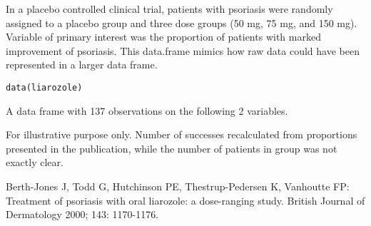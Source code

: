 \begin{Description}\relax
In a placebo controlled clinical trial, patients with psoriasis were randomly assigned
to a placebo group and three dose groups (50 mg, 75 mg, and 150 mg). Variable of primary
interest was the proportion of patients with marked improvement of psoriasis.
This data.frame mimics how raw data could have been represented in a larger data frame.
\end{Description}
\begin{Usage}
\begin{verbatim}data(liarozole)\end{verbatim}
\end{Usage}
\begin{Format}\relax
A data frame with 137 observations on the following 2 variables.
\end{Format}
\begin{Details}\relax
For illustrative purpose only. Number of successes recalculated from proportions
presented in the publication, while the number of patients in group  was not exactly clear.
\end{Details}
\begin{Source}\relax
Berth-Jones J, Todd G, Hutchinson PE, Thestrup-Pedersen K, Vanhoutte FP:
Treatment of psoriasis with oral liarozole: a dose-ranging study.
British Journal of Dermatology 2000; 143: 1170-1176.
\end{Source}
